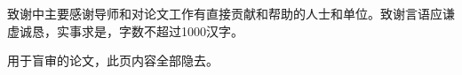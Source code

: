 

致谢中主要感谢导师和对论文工作有直接贡献和帮助的人士和单位。致谢言语应谦虚诚恳，实事求是，字数不超过1000汉字。

\vspace{1em}
{\color{red}用于盲审的论文，此页内容全部隐去}。
